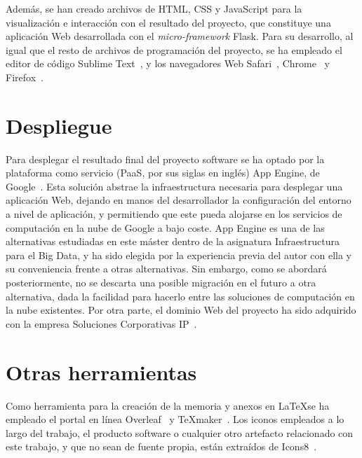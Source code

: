 Además, se han creado archivos de HTML, CSS y JavaScript para la visualización e interacción con el resultado del proyecto, que constituye una aplicación Web desarrollada con el \textit{micro-framework} Flask. Para su desarrollo, al igual que el resto de archivos de programación del proyecto, se ha empleado el editor de código Sublime Text~\cite{sublime}, y los navegadores Web Safari~\cite{safari}, Chrome~\cite{chrome} y Firefox~\cite{firefox}.

\section{Despliegue}

Para desplegar el resultado final del proyecto software se ha optado por la plataforma como servicio (PaaS, por sus siglas en inglés) App Engine, de Google~\cite{appengine}. Esta solución abstrae la infraestructura necesaria para desplegar una aplicación Web, dejando en manos del desarrollador la configuración del entorno a nivel de aplicación, y permitiendo que este pueda alojarse en los servicios de computación en la nube de Google a bajo coste. App Engine es una de las alternativas estudiadas en este máster dentro de la asignatura \guillemotleft Infraestructura para el Big Data\guillemotright, y ha sido elegida por la experiencia previa del autor con ella y su conveniencia frente a otras alternativas. Sin embargo, como se abordará posteriormente, no se descarta una posible migración en el futuro a otra alternativa, dada la facilidad para hacerlo entre las soluciones de computación en la nube existentes. Por otra parte, el dominio Web del proyecto ha sido adquirido con la empresa Soluciones Corporativas IP~\cite{dondominio}.

\section{Otras herramientas}

Como herramienta para la creación de la memoria y anexos en \LaTeX \space se ha empleado el portal en línea Overleaf~\cite{overleaf} y \TeX{}maker~\cite{texmaker}. Los iconos empleados a lo largo del trabajo, el producto software o cualquier otro artefacto relacionado con este trabajo, y que no sean de fuente propia, están extraídos de Icons8~\cite{icons8}.